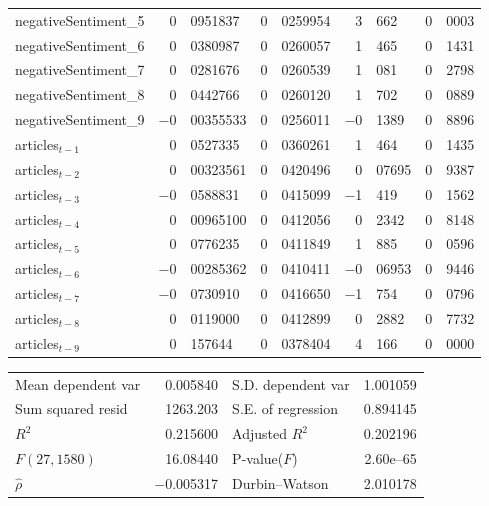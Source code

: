\begin{center}
\begin{longtable}{lr@{.}lr@{.}lr@{.}lr@{.}l}
negativeSentiment\_5 &
    0&0951837 &
    0&0259954 &
        3&662 &
        0&0003 \\
negativeSentiment\_6 &
    0&0380987 &
    0&0260057 &
        1&465 &
        0&1431 \\
negativeSentiment\_7 &
    0&0281676 &
    0&0260539 &
        1&081 &
        0&2798 \\
negativeSentiment\_8 &
    0&0442766 &
    0&0260120 &
        1&702 &
        0&0889 \\
negativeSentiment\_9 &
    $-$0&00355533 &
    0&0256011 &
        $-$0&1389 &
        0&8896 \\
articles$_{t-1}$ &
    0&0527335 &
    0&0360261 &
        1&464 &
        0&1435 \\
articles$_{t-2}$ &
    0&00323561 &
    0&0420496 &
        0&07695 &
        0&9387 \\
articles$_{t-3}$ &
    $-$0&0588831 &
    0&0415099 &
        $-$1&419 &
        0&1562 \\
articles$_{t-4}$ &
    0&00965100 &
    0&0412056 &
        0&2342 &
        0&8148 \\
articles$_{t-5}$ &
    0&0776235 &
    0&0411849 &
        1&885 &
        0&0596 \\
articles$_{t-6}$ &
    $-$0&00285362 &
    0&0410411 &
        $-$0&06953 &
        0&9446 \\
articles$_{t-7}$ &
    $-$0&0730910 &
    0&0416650 &
        $-$1&754 &
        0&0796 \\
articles$_{t-8}$ &
    0&0119000 &
    0&0412899 &
        0&2882 &
        0&7732 \\
articles$_{t-9}$ &
    0&157644 &
    0&0378404 &
        4&166 &
        0&0000 \\
\end{longtable}

\begin{tabular}{lrlr}
Mean dependent var &  0.005840 & S.D. dependent var &  1.001059 \\
Sum squared resid &  1263.203 & S.E. of regression &  0.894145 \\
$R^2$ &  0.215600 & Adjusted $R^2$ &  0.202196 \\
$F(27, 1580)$ &  16.08440 & P-value($F$) &  2.60\textrm{e--65} \\
$\hat{\rho}$ & $-$0.005317 & Durbin--Watson &  2.010178 \\
\end{tabular}

\end{center}

